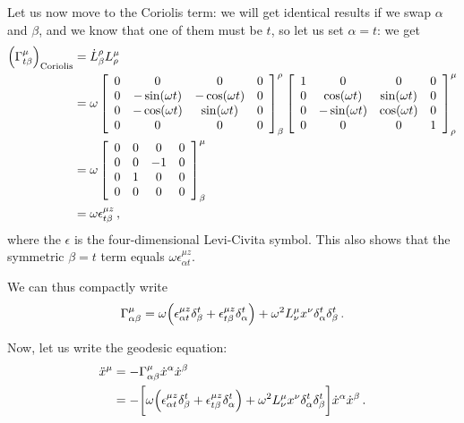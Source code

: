\documentclass[main.tex]{subfiles}
\begin{document}
\begin{extracontent}
Let us now move to the Coriolis term: we will get identical results if we swap \(\alpha \) and \(\beta \), and we know that one of them must be \(t\), so let us set \(\alpha = t\): we get 
%
\begin{align}
\qty(\Gamma^{\mu }_{t \beta }) _{\text{Coriolis}} &= \dot{L}^{\rho }_{\beta } 
L^{\mu }_{\rho } \\
&= \omega \left[\begin{array}{cccc}
0 & 0 & 0 & 0 \\ 
0 & -\sin(\omega t) & -\cos(\omega t) & 0 \\ 
0 & -\cos(\omega t) & \sin(\omega t) & 0 \\ 
0 & 0 & 0 & 0
\end{array}\right]_{\beta }^{\rho }
\left[\begin{array}{cccc}
1 & 0 & 0 & 0 \\ 
0 & \cos(\omega t) & \sin(\omega t) & 0 \\ 
0 & -\sin(\omega t) & \cos(\omega t) & 0 \\ 
0 & 0 & 0 & 1
\end{array}\right]^{\mu }_{\rho }  \\
&= \omega \left[\begin{array}{cccc}
0 & 0 & 0 & 0 \\ 
0 & 0 & -1 & 0 \\ 
0 & 1 & 0 & 0 \\ 
0 & 0 & 0 & 0
\end{array}\right]^{\mu }_{\beta }  \\
&= \omega \epsilon^{\mu z}_{t \beta }
\,,
\end{align}
%
where the \(\epsilon \) is the four-dimensional Levi-Civita symbol. 
This also shows that the symmetric \(\beta = t \) term equals \(\omega \epsilon^{\mu z}_{\alpha t}\). 

We can thus compactly write 
%
\begin{align}
\Gamma^{\mu }_{\alpha \beta } = \omega \qty(\epsilon^{\mu z}_{\alpha t} \delta^{t}_{\beta } + \epsilon^{\mu z }_{t \beta } \delta^{t}_{\alpha  }) + \omega^2 L^{\mu }_{\nu }x^{\nu } \delta^{t}_{\alpha } \delta^{t}_{\beta }
\,.
\end{align}

Now, let us write the geodesic equation: 
%
\begin{align}
\ddot{x}^{\mu } &= - \Gamma^{\mu}_{\alpha \beta } \dot{x}^{\alpha } \dot{x}^{\beta }  \\
&= - \qty[\omega \qty(\epsilon^{\mu z}_{\alpha t} \delta^{t}_{\beta } + \epsilon^{\mu z }_{t \beta } \delta^{t}_{\alpha  }) + \omega^2 L^{\mu }_{\nu }x^{\nu } \delta^{t}_{\alpha } \delta^{t}_{\beta }] \dot{x}^{\alpha } \dot{x}^{\beta }
\,.
\end{align}


\end{extracontent}
\end{document}
